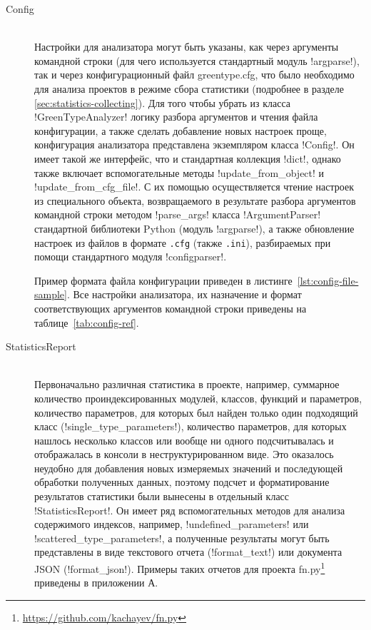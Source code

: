 \begin{description}
  \item[Config] \hfill \\
    Настройки для анализатора могут быть указаны, как через аргументы командной
    строки (для чего используется стандартный модуль !argparse!), так и через
    конфигурационный файл greentype.cfg, что было необходимо для анализа
    проектов в режиме сбора статистики (подробнее в разделе
    \ref{sec:statistics-collecting}). Для того чтобы убрать из класса
    !GreenTypeAnalyzer! логику разбора аргументов и чтения файла конфигурации, а
    также сделать добавление новых настроек проще, конфигурация анализатора
    представлена экземпляром класса !Config!. Он имеет такой же интерфейс, что и
    стандартная коллекция !dict!, однако также включает вспомогательные методы
    !update_from_object! и !update_from_cfg_file!. С их помощью осуществляется
    чтение настроек из специального объекта, возвращаемого в результате разбора
    аргументов командной строки методом !parse_args! класса
    !ArgumentParser! стандартной библиотеки Python (модуль !argparse!), а также
    обновление настроек из файлов в формате \texttt{.cfg} (также \texttt{.ini}),
    разбираемых при помощи стандартного модуля !configparser!.
    
    Пример формата файла конфигурации приведен в
    листинге~\ref{lst:config-file-sample}. Все настройки анализатора, их
    назначение и формат соответствующих аргументов командной строки приведены на
    таблице~\ref{tab:config-ref}.

  \item[StatisticsReport] \hfill \\
    Первоначально различная статистика в проекте, например, суммарное количество
    проиндексированных модулей, классов, функций и параметров, количество
    параметров, для которых был найден только один подходящий класс
    (!single_type_parameters!), количество параметров, для которых нашлось
    несколько классов или вообще ни одного подсчитывалась и отображалась в
    консоли в неструктурированном виде. Это оказалось неудобно для добавления
    новых измеряемых значений и последующей обработки полученных данных, поэтому подсчет
    и форматирование результатов статистики были вынесены в отдельный класс
    !StatisticsReport!. Он имеет ряд вспомогательных методов для анализа
    содержимого индексов, например, !undefined_parameters!  или
    !scattered_type_parameters!, а полученные результаты могут быть
    представлены в виде текстового отчета (!format_text!) или документа JSON
    (!format_json!). Примеры таких отчетов для проекта
    fn.py\footnote{\url{https://github.com/kachayev/fn.py}} приведены в
    приложении А.


  
\end{description}

